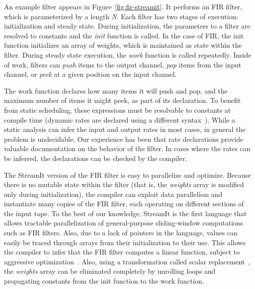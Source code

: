 An example filter appears in Figure~\ref{fig:fir-streamit}.  It
performs an FIR filter, which is parameterized by a length {\it N}.
Each filter has two stages of execution: initialization and steady
state.  During initialization, the parameters to a filter are resolved
to constants and the {\it init} function is called.  In the case of
FIR, the init function initializes an array of weights, which is
maintained as state within the filter.  During steady state execution,
the {\it work} function is called repeatedly.  Inside of work, filters
can {\it push} items to the output channel, {\it pop} items from the
input channel, or {\it peek} at a given position on the input channel.

The work function declares how many items it will push and pop, and
the maximum number of items it might peek, as part of its declaration.
To benefit from static scheduling, these expressions must be
resolvable to constants at compile time (dynamic rates are declared
using a different syntax~\cite{streamit-lang-spec}). While a static
analysis can infer the input and output rates in most cases, in
general the problem is undecidable.  Our experience has been that rate
declarations provide valuable documentation on the behavior of the
filter.  In cases where the rates can be inferred, the declarations
can be checked by the compiler.

The StreamIt version of the FIR filter is easy to parallelize and
optimize.  Because there is no mutable state within the filter (that
is, the {\it weights} array is modified only during initialization),
the compiler can exploit data parallelism and instantiate many copies
of the FIR filter, each operating on different sections of the input
tape.  To the best of our knowledge, StreamIt is the first language
that allows tractable parallelization of general-purpose
sliding-window computations such as FIR filters.  Also, due to a lack
of pointers in the language, values can easily be traced through
arrays from their initialization to their use.  This allows the
compiler to infer that the FIR filter computes a linear function,
subject to aggressive optimization~\cite{lamb-pldi03}.  Also,
using a transformation called scalar
replacement~\cite{sermulins:lctes:2005}, the {\it weights} array can
be eliminated completely by unrolling loops and propagating constants
from the init function to the work function.

